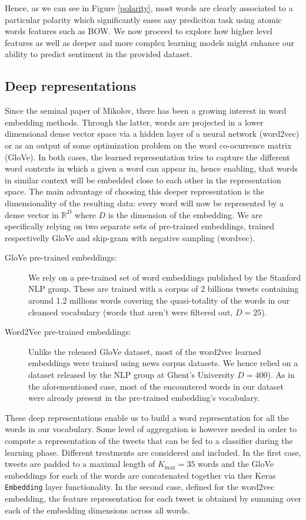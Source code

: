 \documentclass[10pt,conference,compsocconf,retainorgcmds]{IEEEtran}
\begin{document}
Hence, as we can see in Figure \ref{polarity}, most words are clearly associated to a particular polarity which significantly eases any prediciton task using atomic words features such as BOW. 
We now proceed  to explore how higher level features as well as deeper and more complex learning models might enhance our ability to predict sentiment in the provided dataset.

\subsection{Deep representations}
Since the seminal paper of Mikolov, there has been a growing interest in word embedding methods. Through the latter, words are projected in a lower dimensional dense vector space via a hidden layer of a neural network  (word2vec) or as an output of some optimization problem on the word co-ocurrence matrix (GloVe). 
In both cases, the learned representation tries to capture the different word contexts in which a given a word can appear in, hence enabling, that words in similar context will be embedded close to each other in the representation space. The main advantage of choosing this deeper representation is the dimensionality of the resulting data: every word will now be represented by a dense vector in $\mathbb{R}^D$ where $D$ is the dimension of the embedding. We are specifically relying on two separate sets of pre-trained embeddings, trained respectivelly GloVe and skip-gram with negative sampling (wordvec).
\begin{description}
\item[GloVe pre-trained embeddings:] We rely on a pre-trained set of word embeddings published by the Stanford NLP group. These are trained with a corpus of 2 billions tweets containing around 1.2 millions words covering the quasi-totality of the words in our cleansed vocabulary (words that aren't were filtered out, $D=25$).
\item[Word2Vec pre-trained embeddings:] Unlike the released GloVe dataset, most of the word2vec learned embeddings were trained using news corpus datasets. We hence relied on a dataset released by the NLP group at Ghent's University $D=400$). As in the aforementioned case, most of the encountered words in our dataset were already present in the pre-trained embedding's vocabulary.
\end{description}
These deep representations enable us to build a word representation for all the words in our vocabulary. Some level of aggregation is however needed in order to compute a representation of the tweets that can be fed to a classifier during the learning phase. Different treatments are considered and included. In the first case, tweets are padded to a maximal length of $K_{\text{max}}=35$ words and the GloVe embeddings for each of the words are concatenated together via ther Keras \verb+Embedding+ layer functionality. In the second case, defined for the word2vec embedding, the feature representation for each tweet is obtained by summing over each of the embedding dimensions across all words. 
\end{document}
